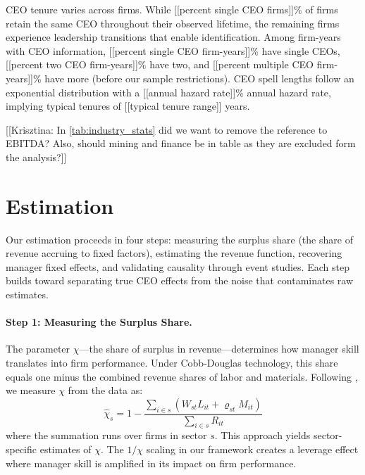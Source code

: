 \documentclass[11pt,a4paper]{article}
\begin{document}
CEO tenure varies across firms. While [[percent single CEO firms]]\% of firms retain the same CEO throughout their observed lifetime, the remaining firms experience leadership transitions that enable identification. Among firm-years with CEO information, [[percent single CEO firm-years]]\% have single CEOs, [[percent two CEO firm-years]]\% have two, and [[percent multiple CEO firm-years]]\% have more (before our sample restrictions). CEO spell lengths follow an exponential distribution with a [[annual hazard rate]]\% annual hazard rate, implying typical tenures of [[typical tenure range]] years.




[[Krisztina: In \ref{tab:industry_stats} did we want to remove the reference to EBITDA? Also, should mining and finance be in table as they are excluded form the analysis?]]

\section{Estimation}

Our estimation proceeds in four steps: measuring the surplus share (the share of revenue accruing to fixed factors), estimating the revenue function, recovering manager fixed effects, and validating causality through event studies. Each step builds toward separating true CEO effects from the noise that contaminates raw estimates.

\paragraph{Step 1: Measuring the Surplus Share.} The parameter $\chi$---the share of surplus in revenue---determines how manager skill translates into firm performance. Under Cobb-Douglas technology, this share equals one minus the combined revenue shares of labor and materials. Following \citet{Gandhi2020-nu}, we measure $\chi$ from the data as:
\begin{equation}
\hat{\chi}_s = 1 - \frac{\sum_{i \in s}(W_{st}L_{it} + \varrho_{st}M_{it})}{\sum_{i \in s} R_{it}}
\end{equation}
where the summation runs over firms in sector $s$. This approach yields sector-specific estimates of $\chi$. The $1/\chi$ scaling in our framework creates a leverage effect where manager skill is amplified in its impact on firm performance.
\end{document}
